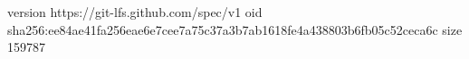 version https://git-lfs.github.com/spec/v1
oid sha256:ee84ae41fa256eae6e7cee7a75c37a3b7ab1618fe4a438803b6fb05c52ceca6c
size 159787
